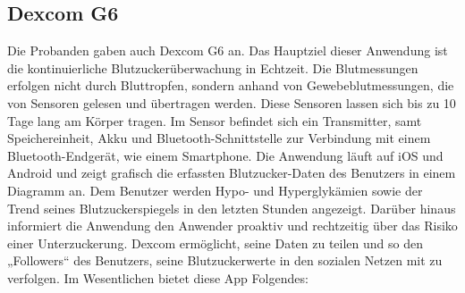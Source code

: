 	\subsection{Dexcom G6}
	Die Probanden gaben auch Dexcom G6 an. Das Hauptziel  dieser Anwendung ist die kontinuierliche Blutzuckerüberwachung in Echtzeit. Die Blutmessungen erfolgen nicht durch Bluttropfen, sondern anhand von Gewebeblutmessungen, die  von Sensoren gelesen und übertragen werden. Diese Sensoren lassen sich bis zu 10 Tage lang am Körper tragen. Im Sensor befindet sich ein  Transmitter, samt Speichereinheit, Akku und Bluetooth-Schnittstelle zur Verbindung mit einem Bluetooth-Endgerät, wie einem Smartphone. Die Anwendung läuft auf iOS und Android und zeigt grafisch die erfassten Blutzucker-Daten des Benutzers in einem Diagramm an. Dem Benutzer werden Hypo- und Hyperglykämien  sowie  der  Trend seines Blutzuckerspiegels in den letzten Stunden angezeigt. Darüber hinaus informiert die Anwendung den Anwender proaktiv und rechtzeitig über das Risiko einer Unterzuckerung. Dexcom ermöglicht, seine Daten zu teilen und so den „Followers“ des Benutzers, seine Blutzuckerwerte in den sozialen Netzen mit zu verfolgen. Im Wesentlichen bietet diese App Folgendes:
	
